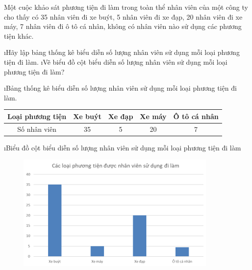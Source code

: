\begin{bt}
	Một cuộc khảo sát phương tiện đi làm trong toàn thể nhân viên của một công ty cho thấy có  35 nhân viên đi xe buýt, 5  nhân viên đi xe đạp,  20 nhân viên đi xe máy, 7  nhân viên đi ô tô cá nhân, không có nhân viên nào sử dụng các phương tiện khác. 
	\begin{enumerate}[a),leftmargin=*]
		\i Hãy lập bảng thống kê biểu diễn số lượng nhân viên sử dụng mỗi loại phương tiện đi làm.
		\i Vẽ biểu đồ cột biểu diễn số lượng nhân viên sử dụng mỗi loại phương tiện đi làm?
	\end{enumerate}
	\begin{loigiaichuong40}
		\begin{enumerate}[a),leftmargin=*]
			\i Bảng thống kê biểu diễn số lượng nhân viên sử dụng mỗi loại phương tiện đi làm.
			\begin{center}
				\begin{tabular}{|c|c|c|c|c|}
					\hline
					Loại phương tiện&	Xe buýt&	Xe đạp&	Xe máy&	Ô tô cá nhân\\
					\hline
					Số nhân viên& 35 &5&20&7\\
					\hline
				\end{tabular}
			\end{center}	 
			\i Biểu đồ cột biểu diễn số lượng nhân viên sử dụng mỗi loại phương tiện đi làm
			\begin{figure}[H]
				\centering
				\vspace*{-5pt}
				\captionsetup{labelformat= empty, justification=centering}
				\includegraphics[width=0.5\linewidth]{10}
				\vspace*{-10pt}
			\end{figure}
		\end{enumerate}
	\end{loigiaichuong40}
\end{bt}
